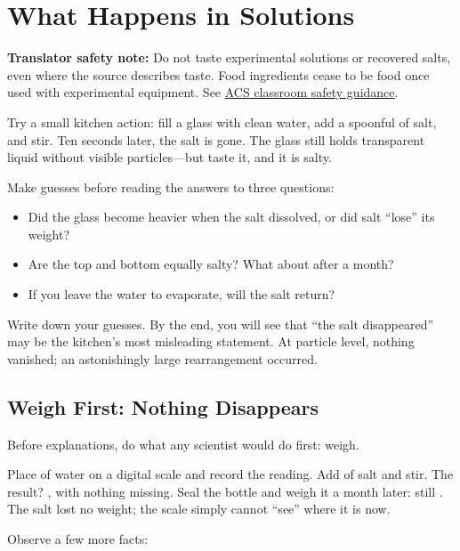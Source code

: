 \chapter{What Happens in Solutions}

\begin{kaichang}
\textbf{Translator safety note:} Do not taste experimental solutions or recovered salts, even where the source describes taste. Food ingredients cease to be food once used with experimental equipment. See \href{https://www.acs.org/content/dam/acsorg/about/governance/committees/chemicalsafety/safetypractices/safety-in-the-elementary-school-science-classroom.pdf}{ACS classroom safety guidance}.

Try a small kitchen action: fill a glass with clean water, add a spoonful of salt, and stir. Ten seconds later, the salt is gone. The glass still holds transparent liquid without visible particles---but taste it, and it is salty.

Make guesses before reading the answers to three questions:
\begin{itemize}[itemsep=2pt]
\item Did the glass become heavier when the salt dissolved, or did salt ``lose'' its weight?
\item Are the top and bottom equally salty? What about after a month?
\item If you leave the water to evaporate, will the salt return?
\end{itemize}

Write down your guesses. By the end, you will see that ``the salt disappeared'' may be the kitchen's most misleading statement. At particle level, nothing vanished; an astonishingly large rearrangement occurred.
\end{kaichang}

\section{Weigh First: Nothing Disappears}

Before explanations, do what any scientist would do first: weigh.

Place  of water on a digital scale and record the reading. Add  of salt and stir. The result? , with nothing missing. Seal the bottle and weigh it a month later: still . The salt lost no weight; the scale simply cannot ``see'' where it is now.

Observe a few more facts:

